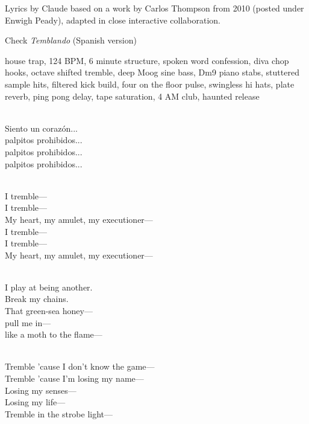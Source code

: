 
\begin{notes}
Lyrics by Claude based on a work by Carlos Thompson from 2010 (posted under Enwigh Peady), adapted in close interactive collaboration.

Check \emph{Temblando} (Spanish version)
\end{notes}
\begin{style}
house trap, 124 BPM, 6 minute structure, spoken word confession, diva chop hooks, octave shifted tremble, deep Moog sine bass, Dm9 piano stabs, stuttered sample hits, filtered kick build, four on the floor pulse, swingless hi hats, plate reverb, ping pong delay, tape saturation, 4 AM club, haunted release
\end{style}
\begin{lyrics}
\\
Siento un corazón...\\
palpitos prohibidos...\\
palpitos prohibidos...\\
palpitos prohibidos...

\\
I tremble—\\
I tremble—\\
My heart, my amulet, my executioner—\\
I tremble—\\
I tremble—\\
My heart, my amulet, my executioner—

\\
I play at being another.\\
Break my chains.\\
That green-sea honey—\\
pull me in—\\
like a moth to the flame—

\\
Tremble 'cause I don't know the game—\\
Tremble 'cause I'm losing my name—\\
Losing my senses—\\
Losing my life—\\
Tremble in the strobe light—


\end{lyrics}
